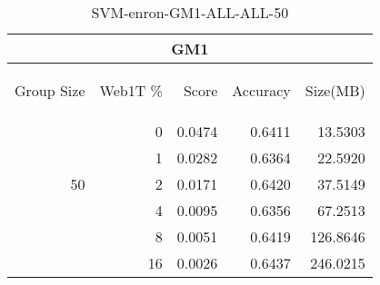 \begin{center}
\begin{table}[htbp] 
 \begin{center}
\begin{tabular}{ | r | r | r | r | r |}
\hline
\multicolumn{5}{|c|}{GM1}\\
\hline
\begin{sideways}Group Size\end{sideways} & \begin{sideways}Web1T \%\end{sideways} & \begin{sideways}Score\end{sideways} & \begin{sideways}Accuracy\end{sideways} & \begin{sideways}Size(MB)\end{sideways}\\
\hline
\multirow{5}{*}{50}
 & 0 & 0.0474 & 0.6411 & 13.5303\\ \cline{2-5}
 & 1 & 0.0282 & 0.6364 & 22.5920\\ \cline{2-5}
 & 2 & 0.0171 & 0.6420 & 37.5149\\ \cline{2-5}
 & 4 & 0.0095 & 0.6356 & 67.2513\\ \cline{2-5}
 & 8 & 0.0051 & 0.6419 & 126.8646\\ \cline{2-5}
 & 16 & 0.0026 & 0.6437 & 246.0215\\ \cline{2-5}
\hline
\end{tabular}
\caption{SVM-enron-GM1-ALL-ALL-50}
\label{table:SVM-enron-GM1-ALL-ALL-50}
\end{center}
 \end{table}
\end{center}

